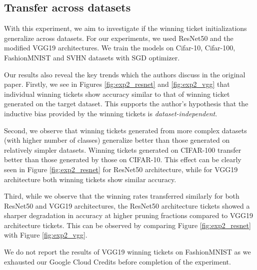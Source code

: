 \documentclass{article}
\begin{document}
\subsection{Transfer across datasets}
With this experiment, we aim to investigate if the winning ticket initializations generalize across datasets. For our experiments, we used ResNet50 and the modified VGG19 architectures. We train the models on Cifar-10, Cifar-100, FashionMNIST and SVHN datasets with SGD optimizer. 

Our results also reveal the key trends which the authors discuss in the original paper. Firstly, we see in Figures \ref{fig:exp2_resnet} and \ref{fig:exp2_vgg} that individual winning tickets show accuracy similar to that of winning ticket generated on the target dataset. This supports the author's hypothesis that the inductive bias provided by the winning tickets is \textit{dataset-independent}.  

Second, we observe that winning tickets generated from more complex datasets (with higher number of classes) generalize better than those generated on relatively simpler datasets. Winning tickets generated on CIFAR-100 transfer better than those generated by those on CIFAR-10. This effect can be clearly seen in Figure \ref{fig:exp2_resnet} for ResNet50 architecture, while for VGG19 architecture both winning tickets show similar accuracy.

Third, while we observe that the winning rates transferred similarly for both ResNet50 and VGG19 architectures, the ResNet50 architecture tickets showed a sharper degradation in accuracy at higher pruning fractions compared to VGG19 architecture tickets. This can be observed by comparing Figure \ref{fig:exp2_resnet} with Figure \ref{fig:exp2_vgg}.

We do not report the results of VGG19 winning tickets on FashionMNIST as we exhausted our Google Cloud Credits before completion of the experiment. 
\end{document}
